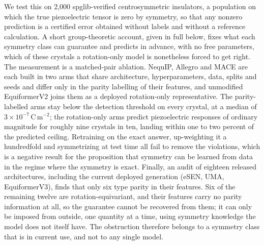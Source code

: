We test this on 2,000 spglib-verified centrosymmetric insulators, a population on which the true piezoelectric tensor is zero by symmetry, so that any nonzero prediction is a certified error obtained without labels and without a reference calculation. A short group-theoretic account, given in full below, fixes what each symmetry class can guarantee and predicts in advance, with no free parameters, which of these crystals a rotation-only model is nonetheless forced to get right. The measurement is a matched-pair ablation. NequIP, Allegro and MACE are each built in two arms that share architecture, hyperparameters, data, splits and seeds and differ only in the parity labelling of their features, and unmodified EquiformerV2 joins them as a deployed rotation-only representative. The parity-labelled arms stay below the detection threshold on every crystal, at a median of $3\times10^{-7}$\,C\,m$^{-2}$; the rotation-only arms predict piezoelectric responses of ordinary magnitude for roughly nine crystals in ten, landing within one to two percent of the predicted ceiling. Retraining on the exact answer, up-weighting it a hundredfold and symmetrizing at test time all fail to remove the violations, which is a negative result for the proposition that symmetry can be learned from data in the regime where the symmetry is exact. Finally, an audit of eighteen released architectures, including the current deployed generation (eSEN, UMA, EquiformerV3), finds that only six type parity in their features. Six of the remaining twelve are rotation-equivariant, and their features carry no parity information at all, so the guarantee cannot be recovered from them; it can only be imposed from outside, one quantity at a time, using symmetry knowledge the model does not itself have. The obstruction therefore belongs to a symmetry class that is in current use, and not to any single model.
